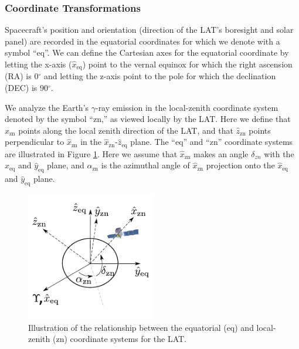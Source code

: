 \subsubsection{Coordinate Transformations}

Spacecraft's position and orientation (direction of the
LAT's boresight and solar panel) are recorded in the equatorial
coordinates for which we denote with a symbol ``eq''. We can define
the Cartesian axes for the equatorial coordinate by letting the
x-axis ($\hat{x}_\text{eq}$) point to the vernal equinox for which the right
ascension (RA) is 0$^\circ$ and letting the z-axis point to the
pole for which the declination (DEC) is 90$^\circ$.

We analyze the Earth's $\gamma$-ray emission in the local-zenith
coordinate system denoted by the symbol ``zn,'' as viewed locally
by the LAT.  Here we define that $\hat{x}_\text{zn}$
points along the local
zenith direction of the LAT, and that $\hat{z}_\text{zn}$
points perpendicular
to $\hat{x}_\text{zn}$ in the $\hat{x}_\text{zn}$-$\hat{z}_\text{eq}$
plane. The ``eq'' and ``zn''
coordinate systems are illustrated in Figure \ref{fig:coord_eq_sp}.
Here we assume that $\hat{x}_\text{zn}$ makes an angle 
$\delta_{zn}$ with
the $\hat{x}_\text{eq}$ and $\hat{y}_\text{eq}$ plane,
and $\alpha_\text{zn}$ is the azimuthal
angle of $\hat{x}_\text{zn}$ projection onto
the $\hat{x}_\text{eq}$ and $\hat{y}_\text{eq}$ plane.

\begin{figure}[h!]
    \centering
    \includegraphics[width=0.5\textwidth]{content/methodology/figures/fig_coordinate/coord_eq_sp_v3.pdf}
    \caption{
        Illustration of the relationship between the equatorial (eq)
        and local-zenith (zn) coordinate systems for the LAT.
    }
    \label{fig:coord_eq_sp}
\end{figure}


